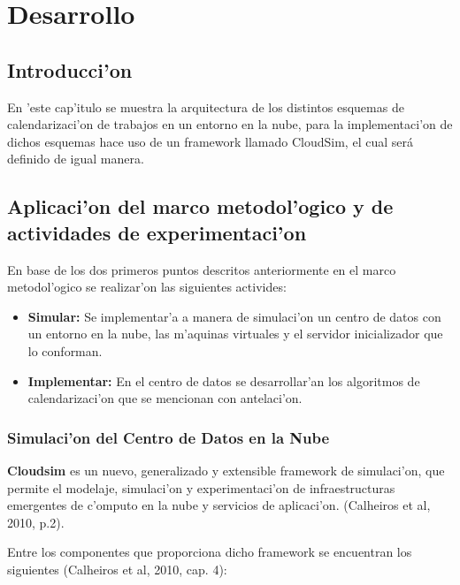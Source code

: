 \chapter{Desarrollo}
\section*{Introducci'on}

En 'este cap'itulo se muestra la arquitectura de los distintos esquemas de calendarizaci'on de trabajos en un entorno en la nube, para la implementaci'on de dichos esquemas hace uso de un framework llamado CloudSim, el cual será definido de igual manera.


\newpage


\section{Aplicaci'on del marco metodol'ogico y de actividades de experimentaci'on}

En base de los dos primeros puntos descritos anteriormente en el marco metodol'ogico se realizar'on las siguientes activides:

\begin{itemize}
	\item \textbf{Simular:} Se implementar'a a manera de simulaci'on un centro de datos con un entorno en la nube, las m'aquinas virtuales y el servidor inicializador que lo conforman.
	\item \textbf{Implementar:} En el centro de datos se desarrollar'an los algoritmos de calendarizaci'on que se mencionan con antelaci'on.
\end{itemize}

\subsection{Simulaci'on del Centro de Datos en la Nube}

 \textbf{Cloudsim} es un nuevo, generalizado y extensible framework de simulaci'on, que permite el modelaje, simulaci'on y experimentaci'on de infraestructuras emergentes de c'omputo en la nube y servicios de aplicaci'on. (Calheiros et al, 2010, p.2).

Entre los componentes que proporciona dicho framework se encuentran los siguientes (Calheiros et al, 2010, cap. 4):


